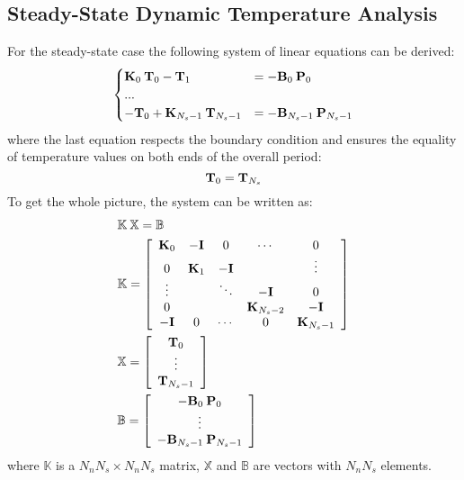 \subsection{Steady-State Dynamic Temperature Analysis}
For the steady-state case the following system of linear equations can be derived:
\[
  \begin{cases}
    \mathbf{K}_0 \: \mathbf{T}_0 - \mathbf{T}_1 & = -\mathbf{B}_0 \: \mathbf{P}_0 \\
    ... \\
    -\mathbf{T}_0 + \mathbf{K}_{N_s - 1} \: \mathbf{T}_{N_s - 1} & = -\mathbf{B}_{N_s - 1} \: \mathbf{P}_{N_s - 1}
  \end{cases}
\]
where the last equation respects the boundary condition and ensures the equality of temperature values on both ends of the overall period:
\begin{equation} \label{eq:boundary-condition}
  \mathbf{T}_0 = \mathbf{T}_{N_s}
\end{equation}
To get the whole picture, the system can be written as:
\begin{align}
  & \mathbb{K} \: \mathbb{X} = \mathbb{B} \label{eq:system} \\
  & \mathbb{K} = \left[
    \begin{array}{ccccc}
      \mathbf{K}_0 & -\mathbf{I} & 0 & \cdots & 0 \\
      0 & \mathbf{K}_1 & -\mathbf{I} &  & \vdots \\
      \vdots &  & \ddots & -\mathbf{I} & 0 \\
      0 &  &  & \mathbf{K}_{N_s - 2} & -\mathbf{I} \\
      -\mathbf{I} & 0 & \cdots & 0 & \mathbf{K}_{N_s - 1}
    \end{array}
  \right] \nonumber \\
  & \mathbb{X} = \left[
    \begin{array}{c}
      \mathbf{T}_0 \\
      \vdots \\
      \mathbf{T}_{N_s - 1}
    \end{array}
  \right] \nonumber \\
  & \mathbb{B} = \left[
    \begin{array}{c}
      -\mathbf{B}_0 \: \mathbf{P}_0 \\
      \vdots \\
      -\mathbf{B}_{N_s - 1} \: \mathbf{P}_{N_s - 1}
    \end{array}
  \right] \nonumber
\end{align}
where $\mathbb{K}$ is a $N_n N_s \times N_n N_s$ matrix, $\mathbb{X}$ and $\mathbb{B}$ are vectors with $N_n N_s$ elements.

